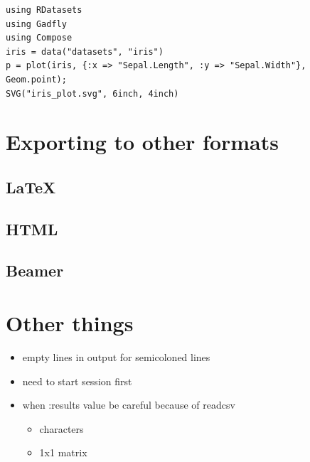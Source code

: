 \documentclass[11pt]{article}
\begin{document}
\begin{verbatim}
using RDatasets
using Gadfly
using Compose
iris = data("datasets", "iris")
p = plot(iris, {:x => "Sepal.Length", :y => "Sepal.Width"}, Geom.point);
SVG("iris_plot.svg", 6inch, 4inch)
\end{verbatim}

\section[Exporting to other formats]{Exporting to other formats}
\label{sec-7}

\subsection[\LaTeX{}]{\LaTeX{}}
\label{sec-7-1}

\subsection[HTML]{HTML}
\label{sec-7-2}

\subsection[Beamer]{Beamer}
\label{sec-7-3}
\section[Other things]{Other things}
\label{sec-8}

\begin{itemize}
\item empty lines in output for semicoloned lines
\item need to start session first
\item when :results value be careful because of readcsv
\begin{itemize}
\item characters
\item 1x1 matrix
\end{itemize}
\end{itemize}
\end{document}
